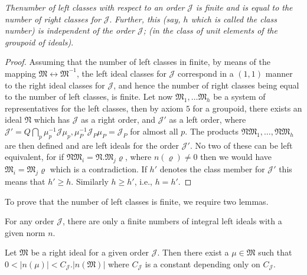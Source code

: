 \setcounter{theorem}{0}
\begin{theorem}\label{chap1:sec3:thm1} %
  {\em The\pageoriginale number of left classes with respect to an order}
  $\mathcal{J}$ {\em is finite and is equal to the number of right
    classes for} $\mathcal{J}$. {\em Further, this (say,  $h$ which is
    called the class number) is independent of the order
    $\mathcal{J}$; (in the class of unit elements of the groupoid of
    ideals)}. 
\end{theorem}

\begin{proof}
  Assuming that the number of left classes in finite, by means of the
  mapping $\mathfrak{M} \leftrightarrow \mathfrak{M}^{-1}$, the left
  ideal classes for $\mathcal{J}$ correspond in a $(1,1)$  manner to
  the right ideal classes for $\mathcal{J}$, and hence the number of
  right classes being equal to the number of left classes,  is
  finite. Let now $\mathfrak{M}_1, \ldots \mathfrak{M}_h$ be a system
  of representatives for  the left classes, then by
  axiom $5$ for a groupoid, there  exists an ideal $\mathfrak{N}$
  which has $\mathcal{J}$ as a right order, and $\mathcal{J}'$ as a
  left order, where $\mathcal{J}' = Q \bigcap\limits_{p} \mu^{-1}_p
  \mathcal{J} \mu_p, \mu^{-1}_P \mathcal{J}_P \mu_P =\mathcal{J}_P$
  for almost all $p$. The products $\mathfrak{N} \mathfrak{M}_1, \ldots
  ,  \mathfrak{N} \mathfrak{M}_h$ are then defined and are left ideals
  for the order $\mathcal{J}'$. No two of these can be left
  equivalent, for if $\mathfrak{N} \mathfrak{M}_i =
  \mathfrak{N}. \mathfrak{M}_j \varrho$, where $n (\varrho) \neq 0$
  then we would have $\mathfrak{M}_i = \mathfrak{M}_j \varrho$ which
  is a contradiction. If $h'$ denotes the class member for
  $\mathcal{J}'$ this means that $h'\ge h$. Similarly $h \ge h'$,
  i.e., $h=h'$.    
\end{proof}

To prove that the number of left classes is finite, we require two lemmas.

\setcounter{Lemma}{0}
\begin{Lemma}\label{chap1:sec3:thm1:lem1}
  For any order $\mathcal{J}$, there are only  a finite numbers
    of integral left ideals with a given norm $n$. 
\end{Lemma}

\begin{Lemma}\label{chap1:sec3:thm1:lem2}
   Let $\mathfrak{M}$ be a right ideal for a given order
    $\mathcal{J}$. Then there exist a $\mu \in \mathfrak{M}$ such
    that $0 <  | n(\mu) | < C_{\mathcal{J}}. | n (\mathfrak{M}) |$
    where $C_{\mathcal{J}}$ is a constant depending only on
    $C_{\mathcal{J}}$. 
\end{Lemma}

